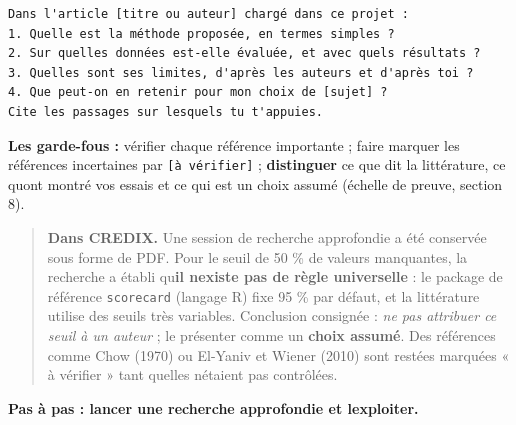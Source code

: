 \documentclass[
  french,
  11pt,
  a4paper,
]{article}
\begin{document}
\begin{Verbatim}[breaklines=true,breakanywhere=true,fontsize=\small,frame=leftline,framerule=1.6pt,rulecolor=\color{credixblue},framesep=3mm,xleftmargin=2mm,xrightmargin=1mm]
Dans l'article [titre ou auteur] chargé dans ce projet :
1. Quelle est la méthode proposée, en termes simples ?
2. Sur quelles données est-elle évaluée, et avec quels résultats ?
3. Quelles sont ses limites, d'après les auteurs et d'après toi ?
4. Que peut-on en retenir pour mon choix de [sujet] ?
Cite les passages sur lesquels tu t'appuies.
\end{Verbatim}

\textbf{Les garde-fous :} vérifier chaque référence importante ; faire
marquer les références incertaines par \texttt{{[}à\ vérifier{]}} ;
\textbf{distinguer} ce que dit la littérature, ce qu\textquotesingle ont
montré vos essais et ce qui est un choix assumé (échelle de preuve,
section 8).

\begin{quote}
\textbf{Dans CREDIX.} Une session de recherche approfondie a été
conservée sous forme de PDF. Pour le seuil de 50 \% de valeurs
manquantes, la recherche a établi qu\textquotesingle{}\textbf{il
n\textquotesingle existe pas de règle universelle} : le package de
référence \texttt{scorecard} (langage R) fixe 95 \% par défaut, et la
littérature utilise des seuils très variables. Conclusion consignée :
\emph{ne pas attribuer ce seuil à un auteur} ; le présenter comme un
\textbf{choix assumé}. Des références comme Chow (1970) ou El-Yaniv et
Wiener (2010) sont restées marquées « à vérifier » tant
qu\textquotesingle elles n\textquotesingle étaient pas contrôlées.
\end{quote}

\textbf{Pas à pas : lancer une recherche approfondie et
l\textquotesingle exploiter.}
\end{document}
